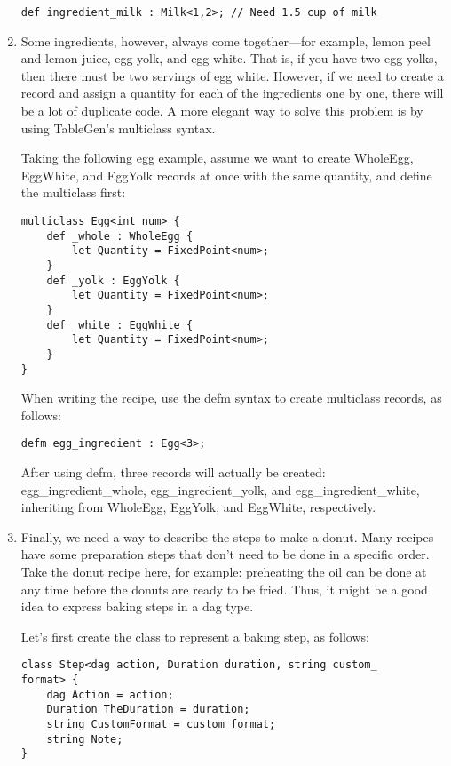 \begin{enumerate}
\begin{lstlisting}[style=styleCXX]
def ingredient_milk : Milk<1,2>; // Need 1.5 cup of milk
\end{lstlisting}

\item Some ingredients, however, always come together—for example, lemon peel and lemon juice, egg yolk, and egg white. That is, if you have two egg yolks, then there must be two servings of egg white. However, if we need to create a record and assign a quantity for each of the ingredients one by one, there will be a lot of duplicate code. A more elegant way to solve this problem is by using TableGen's multiclass syntax.

Taking the following egg example, assume we want to create WholeEgg, EggWhite, and EggYolk records at once with the same quantity, and define the multiclass first:

\begin{lstlisting}[style=styleCXX]
multiclass Egg<int num> {
	def _whole : WholeEgg {
		let Quantity = FixedPoint<num>;
	}
	def _yolk : EggYolk {
		let Quantity = FixedPoint<num>;
	}
	def _white : EggWhite {
		let Quantity = FixedPoint<num>;
	}
}
\end{lstlisting}

When writing the recipe, use the defm syntax to create multiclass records, as follows:

\begin{lstlisting}[style=styleCXX]
defm egg_ingredient : Egg<3>;
\end{lstlisting}

After using defm, three records will  actually be created: egg\_ingredient\_whole, egg\_ingredient\_yolk, and egg\_ingredient\_white, inheriting from WholeEgg, EggYolk, and EggWhite, respectively.

\item Finally, we need a way to describe the steps to make a donut. Many recipes have some preparation steps that don't need to be done in a specific order. Take the donut recipe here, for example: preheating the oil can be done at any time before the donuts are ready to be fried. Thus, it might be a good idea to express baking steps in a dag type.

Let's first create the class to represent a baking step, as follows:

\begin{lstlisting}[style=styleCXX]
class Step<dag action, Duration duration, string custom_
format> {
	dag Action = action;
	Duration TheDuration = duration;
	string CustomFormat = custom_format;
	string Note;
}
\end{lstlisting}


\end{enumerate}
